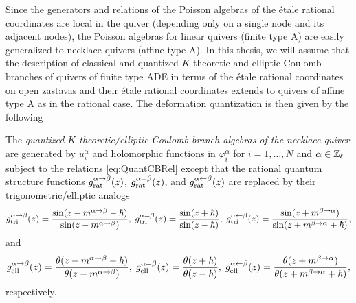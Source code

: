 \begin{remark}
	Since the generators and relations of the Poisson algebras of the étale rational coordinates are local in the quiver (depending only on a single node and its adjacent nodes), the Poisson algebras for linear quivers (finite type A) are easily generalized to necklace quivers (affine type A). In this thesis, we will assume that the description of classical and quantized $K$-theoretic and elliptic Coulomb branches of quivers of finite type ADE in terms of the étale rational coordinates on open zastavas and their étale rational coordinates extends to quivers of affine type A as in the rational case. The deformation quantization is then given by the following
\end{remark}

\begin{definition}
    The \emph{quantized $K$-theoretic/elliptic Coulomb branch algebras of the necklace quiver} are generated by $u_i^\alpha$ and holomorphic functions in $\varphi_i^\alpha$ for $i=1,\dots,N$ and $\alpha \in \mathbb{Z}_\ell$ subject to the relations \eqref{eq:QuantCBRel} except that the rational quantum structure functions $g_\textup{rat}^{\alpha \to \beta}(z)$, $g_\textup{rat}^{\alpha = \beta}(z)$, and $g_\textup{rat}^{\alpha \leftarrow \beta}(z)$ are replaced by their trigonometric/elliptic analogs
	\begin{align}
		g_\textup{tri}^{\alpha \to \beta}(z) = \frac{\sin(z-m^{\alpha\to\beta}-\hbar)}{\sin(z-m^{\alpha\to\beta})}, \;
		g_\textup{tri}^{\alpha = \beta}(z) = \frac{\sin(z+\hbar)}{\sin(z-\hbar)}, \;
		g_\textup{tri}^{\alpha \leftarrow \beta}(z) = \frac{\sin(z+m^{\beta\to\alpha})}{\sin(z+m^{\beta\to\alpha}+\hbar)},
	\end{align}
    and
    \begin{align}
		g_\textup{ell}^{\alpha \to \beta}(z) = \frac{\theta(z-m^{\alpha\to\beta}-\hbar)}{\theta(z-m^{\alpha\to\beta})}, \;
		g_\textup{ell}^{\alpha = \beta}(z) = \frac{\theta(z+\hbar)}{\theta(z-\hbar)}, \;
		g_\textup{ell}^{\alpha \leftarrow \beta}(z) = \frac{\theta(z+m^{\beta\to\alpha})}{\theta(z+m^{\beta\to\alpha}+\hbar)},
	\end{align}
    respectively.
\end{definition}


